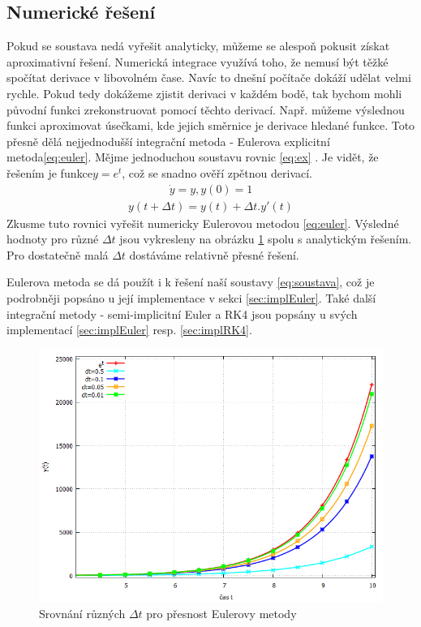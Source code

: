 \subsection{Numerické řešení}
Pokud se soustava nedá vyřešit analyticky, můžeme se alespoň pokusit získat aproximativní řešení. Numerická integrace využívá toho, že nemusí být těžké spočítat derivace v libovolném čase. Navíc to dnešní počítače dokáží udělat velmi rychle. Pokud tedy dokážeme zjistit derivaci v každém bodě, tak bychom mohli původní funkci zrekonstruovat pomocí těchto derivací. Např. můžeme výslednou funkci aproximovat úsečkami, kde jejich směrnice je derivace hledané funkce. Toto přesně dělá nejjednodušší integrační metoda - Eulerova explicitní metoda\eqref{eq:euler}.
Mějme jednoduchou soustavu rovnic \eqref{eq:ex} . Je vidět, že řešením je funkce$ y=e^t $, což se snadno ověří zpětnou derivací. 
\begin{align} \label{eq:ex}
\dot	y = y, y(0)=1
\end{align}
\begin{align} \label{eq:euler}
y(t+\Delta t) = y(t) + \Delta t . y'(t)
\end{align}
Zkusme tuto rovnici vyřešit numericky Eulerovou metodou \eqref{eq:euler}. 
Výsledné hodnoty pro různé  $ \Delta t $ jsou vykresleny na obrázku \ref{fig:euler} spolu s analytickým řešením.
Pro dostatečně malá  $ \Delta t $ dostáváme relativně přesné řešení.

Eulerova metoda se dá použít i k řešení naší soustavy \eqref{eq:soustava}, což je podrobněji popsáno u její implementace v sekci \ref{sec:implEuler}. Také další integrační metody - semi-implicitní Euler a RK4 jsou popsány u svých implementací
\ref{sec:implEuler} resp. \ref{sec:implRK4}.
\begin{figure}[p]
	\caption{Srovnání různých $ \Delta t $ pro přesnost Eulerovy metody}
	\label{fig:euler}
	\centering
	\includegraphics[width=\linewidth]{Figs/eulerTable}
\end{figure}









